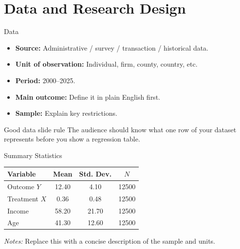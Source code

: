 \documentclass[10pt]{beamer}
\begin{document}
\section{Data and Research Design}

\begin{frame}{Data}
\begin{itemize}
  \item \textbf{Source:} Administrative / survey / transaction / historical data.
  \item \textbf{Unit of observation:} Individual, firm, county, country, etc.
  \item \textbf{Period:} 2000--2025.
  \item \textbf{Main outcome:} Define it in plain English first.
  \item \textbf{Sample:} Explain key restrictions.
\end{itemize}

\vspace{0.6em}
\begin{block}{Good data slide rule}
The audience should know what one row of your dataset represents before you show a regression table.
\end{block}
\end{frame}

\begin{frame}{Summary Statistics}
\centering
\small
\begin{threeparttable}
\begin{tabular}{lS[table-format=4.2]S[table-format=4.2]S[table-format=5.0]}
\toprule
Variable & {Mean} & {Std. Dev.} & {$N$} \\
\midrule
Outcome $Y$      & 12.40 & 4.10 & 12500 \\
Treatment $X$    & 0.36  & 0.48 & 12500 \\
Income           & 58.20 & 21.70 & 12500 \\
Age              & 41.30 & 12.60 & 12500 \\
\bottomrule
\end{tabular}
\begin{tablenotes}\footnotesize
\item \textit{Notes:} Replace this with a concise description of the sample and units.
\end{tablenotes}
\end{threeparttable}
\end{frame}
\end{document}
